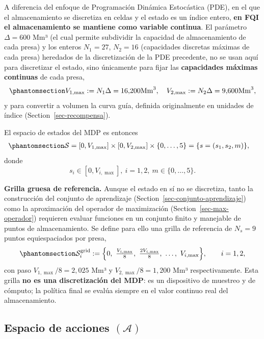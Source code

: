 \documentclass[
  letterpaper,
  DIV=11,
  numbers=noendperiod]{scrreprt}
\theoremstyle{definition}
\theoremstyle{remark}
\begin{document}
A diferencia del enfoque de Programación Dinámica Estocástica (PDE), en
el que el almacenamiento se discretiza en celdas y el estado es un
índice entero, \textbf{en FQI el almacenamiento se mantiene como
variable continua}. El parámetro \(\Delta = 600\) Mm³ (el cual permite
subdividir la capacidad de almacenamiento de cada presa) y los enteros
\(N_1 = 27\), \(N_2 = 16\) (capacidades discretas máximas de cada presa)
heredados de la discretización de la PDE precedente, no se usan aquí
para discretizar el estado, sino únicamente para fijar las
\textbf{capacidades máximas continuas} de cada presa,
\begin{equation}\protect\phantomsection\label{eq-capacidad-maxima}{V_{1,\max} := N_1 \Delta = 16{,}200  \text{Mm}^3, \quad V_{2,\max} := N_2 \Delta = 9{,}600 \text{Mm}^3,}\end{equation}
y para convertir a volumen la curva guía, definida originalmente en
unidades de índice (Section~\ref{sec-recompensa}).

El espacio de estados del MDP es entonces
\begin{equation}\protect\phantomsection\label{eq-espacio-estados}{
\begin{aligned}
\mathcal{S}
&= [0,V_{1,\max}]\times[0,V_{2,\max}]
   \times\{0,\dots,5\} = \{s=(s_1,s_2,m)\},
\end{aligned}
}\end{equation} donde \[s_i\in[0,V_{i,\max}],\ i=1,2,\ 
m\in\{0,\dots,5\}.\]

\textbf{Grilla gruesa de referencia.} Aunque el estado en sí no se
discretiza, tanto la construcción del conjunto de aprendizaje
(Section~\ref{sec-conjunto-aprendizaje}) como la aproximación del
operador de maximización (Section~\ref{sec-max-operador}) requieren
evaluar funciones en un conjunto finito y manejable de puntos de
almacenamiento. Se define para ello una grilla de referencia de
\(N_s=9\) puntos equiespaciados por presa,
\begin{equation}\protect\phantomsection\label{eq-grilla-estado}{
\mathcal S_i^{\text{grid}} := \Big\{0,\ \tfrac{V_{i,\max}}{8},\ \tfrac{2V_{i,\max}}{8},\ \dots,\ V_{i,\max}\Big\}, \qquad i=1,2,
}\end{equation} con paso \(V_{1,\max}/8=2{,}025\) Mm³ y
\(V_{2,\max}/8=1{,}200\) Mm³ respectivamente. Esta grilla \textbf{no es
una discretización del MDP}: es un dispositivo de muestreo y de cómputo;
la política final se evalúa siempre en el valor continuo real del
almacenamiento.

\subsection{\texorpdfstring{Espacio de acciones
\((\mathcal{A})\)}{Espacio de acciones (\textbackslash mathcal\{A\})}}\label{sec-espacio-acciones}
\end{document}
